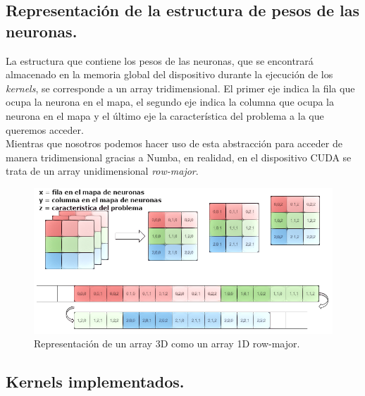 \subsection{Representación de la estructura de pesos de las neuronas.}
La estructura que contiene los pesos de las neuronas, que se encontrará almacenado en la memoria global del dispositivo durante la ejecución de los \textit{kernels}, se corresponde a un array tridimensional. El primer eje indica la fila que ocupa la neurona en el mapa, el segundo eje indica la columna que ocupa la neurona en el mapa y el último eje la característica del problema a la que queremos acceder.\\

Mientras que nosotros podemos hacer uso de esta abstracción para acceder de manera tridimensional gracias a Numba, en realidad, en el dispositivo CUDA se trata de un array unidimensional \textit{row-major}.


\begin{figure}[ht]
\centering
\includegraphics[scale=2.0]{imagenes/row-major.png}
\caption{Representación de un array 3D como un array 1D row-major.}
\label{image:rowmajor}
\end{figure}

\subsection{Kernels implementados.}

